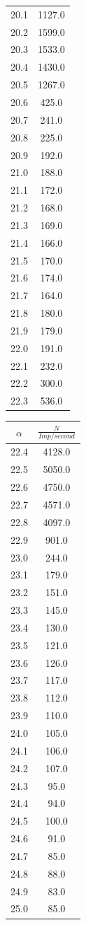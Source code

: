 \begin{table}
\begin{tabular}[t]{cc}
  20.1 & 1127.0\\
  20.2 & 1599.0\\
  20.3 & 1533.0\\
  20.4 & 1430.0\\
  20.5 & 1267.0\\
  20.6 & 425.0\\
  20.7 & 241.0\\
  20.8 & 225.0\\
  20.9 & 192.0\\
  21.0 & 188.0\\
  21.1 & 172.0\\
  21.2 & 168.0\\
  21.3 & 169.0\\
  21.4 & 166.0\\
  21.5 & 170.0\\
  21.6 & 174.0\\
  21.7 & 164.0\\
  21.8 & 180.0\\
  21.9 & 179.0\\
  22.0 & 191.0\\
  22.1 & 232.0\\
  22.2 & 300.0\\
  22.3 & 536.0\\
  \bottomrule
  \end{tabular}
  \begin{tabular}[t]{cc}
  \toprule
  $\alpha$ & $\frac{N}{Imp/\si{second}}$ \\
  \midrule
  22.4 & 4128.0\\
  22.5 & 5050.0\\
  22.6 & 4750.0\\
  22.7 & 4571.0\\
  22.8 & 4097.0\\
  22.9 & 901.0\\
  23.0 & 244.0\\
  23.1 & 179.0\\
  23.2 & 151.0\\
  23.3 & 145.0\\
  23.4 & 130.0\\
  23.5 & 121.0\\
  23.6 & 126.0\\
  23.7 & 117.0\\
  23.8 & 112.0\\
  23.9 & 110.0\\
  24.0 & 105.0\\
  24.1 & 106.0\\
  24.2 & 107.0\\
  24.3 & 95.0\\
  24.4 & 94.0\\
  24.5 & 100.0\\
  24.6 & 91.0\\
  24.7 & 85.0\\
  24.8 & 88.0\\
  24.9 & 83.0\\
  25.0 & 85.0\\
  \bottomrule
  \end{tabular}
  \label{tab:emmision2}
\end{table}
\FloatBarrier

